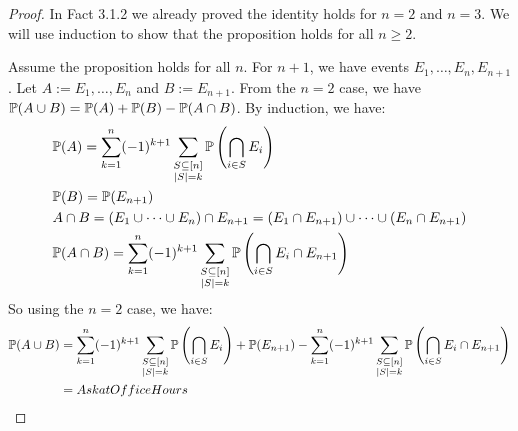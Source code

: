 \begin{proof}
   In Fact 3.1.2 we already proved the identity holds for $n = 2$ and $n = 3$. We will use induction to show that the proposition holds for all $n \geq 2$. 

   Assume the proposition holds for all $n$. For $n + 1$, we have events $E_1, \dots, E_n, E_{n+1}$. Let $A := E_1, \dots, E_n$ and $B := E_{n + 1}$. From the $n = 2$ case, we have $\mathbb{P}(A \cup B) = \mathbb{P}(A) + \mathbb{P}(B) - \mathbb{P}(A \cap B)$. By induction, we have:
   \begin{align*}
      &\mathbb{P}(A) = \sum_{k = 1}^{n}(-1)^{k+1}\sum_{\substack{S \subseteq [n] \\ |S| = k}}\mathbb{P}\left(\bigcap_{i \in S}E_i\right) \\
      &\mathbb{P}(B) = \mathbb{P}(E_{n+1}) \\
      &A \cap B = (E_1 \cup \dots \cup E_n) \cap E_{n+1} = (E_1 \cap E_{n+1}) \cup \dots \cup (E_n \cap E_{n+1}) \\
      &\mathbb{P}(A \cap B) = \sum_{k = 1}^{n}(-1)^{k+1}\sum_{\substack{S \subseteq [n] \\ |S| = k}}\mathbb{P}\left(\bigcap_{i \in S}E_i \cap E_{n+1}\right) 
   \end{align*}
   So using the $n = 2$ case, we have:
   \begin{align*}
      \mathbb{P}(A \cup B) &= \sum_{k = 1}^{n}(-1)^{k+1}\sum_{\substack{S \subseteq [n] \\ |S| = k}}\mathbb{P}\left(\bigcap_{i \in S}E_i\right) + \mathbb{P}(E_{n+1}) -  \sum_{k = 1}^{n}(-1)^{k+1}\sum_{\substack{S \subseteq [n] \\ |S| = k}}\mathbb{P}\left(\bigcap_{i \in S}E_i \cap E_{n+1}\right)  \\
                    &= Ask at Office Hours \qedhere
   \end{align*}
\end{proof}

